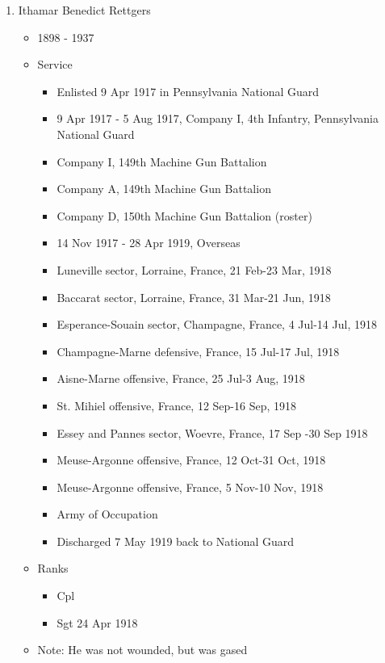 \documentclass[11pt,letter]{book}
\begin{document}
\begin{enumerate}
\item Ithamar Benedict Rettgers
\begin{itemize}
\item 1898 - 1937
\item Service
\begin{itemize}
\item Enlisted 9 Apr 1917 in Pennsylvania National Guard
\item 9 Apr 1917 - 5 Aug 1917, Company I, 4th Infantry, Pennsylvania National Guard
\item Company I, 149th Machine Gun Battalion
\item Company A, 149th Machine Gun Battalion
\item Company D, 150th Machine Gun Battalion (roster)
\item 14 Nov 1917 - 28 Apr 1919, Overseas
\item Luneville sector, Lorraine, France, 21 Feb-23 Mar, 1918
\item Baccarat sector, Lorraine, France, 31 Mar-21 Jun, 1918
\item Esperance-Souain sector, Champagne, France, 4 Jul-14 Jul, 1918
\item Champagne-Marne defensive, France, 15 Jul-17 Jul, 1918
\item Aisne-Marne offensive, France, 25 Jul-3 Aug, 1918
\item St. Mihiel offensive, France, 12 Sep-16 Sep, 1918
\item Essey and Pannes sector, Woevre, France, 17 Sep -30 Sep 1918
\item Meuse-Argonne offensive, France, 12 Oct-31 Oct, 1918
\item Meuse-Argonne offensive, France, 5 Nov-10 Nov, 1918
\item Army of Occupation
\item Discharged 7 May 1919 back to National Guard
\end{itemize}
\item Ranks
\begin{itemize}
\item Cpl
\item Sgt 24 Apr 1918
\end{itemize}
\item Note: He was not wounded, but was gased
\end{itemize}

\end{enumerate}

\end{document}
